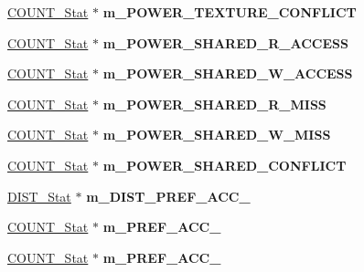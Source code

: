 \begin{DoxyCompactItemize}
\item 
\hypertarget{classall__stats__c_a65fd223770ab808c91e01dbbbe8b06cc}{
\hyperlink{classCOUNT__Stat}{COUNT\_\-Stat} $\ast$ {\bfseries m\_\-POWER\_\-TEXTURE\_\-CONFLICT}}
\label{classall__stats__c_a65fd223770ab808c91e01dbbbe8b06cc}

\item 
\hypertarget{classall__stats__c_a4eb18db354960c064d6380e5e2516b43}{
\hyperlink{classCOUNT__Stat}{COUNT\_\-Stat} $\ast$ {\bfseries m\_\-POWER\_\-SHARED\_\-R\_\-ACCESS}}
\label{classall__stats__c_a4eb18db354960c064d6380e5e2516b43}

\item 
\hypertarget{classall__stats__c_a0c170305f16a3135019716bb65c4cee8}{
\hyperlink{classCOUNT__Stat}{COUNT\_\-Stat} $\ast$ {\bfseries m\_\-POWER\_\-SHARED\_\-W\_\-ACCESS}}
\label{classall__stats__c_a0c170305f16a3135019716bb65c4cee8}

\item 
\hypertarget{classall__stats__c_afb5b1735ddccec196b7597d0a319b7fe}{
\hyperlink{classCOUNT__Stat}{COUNT\_\-Stat} $\ast$ {\bfseries m\_\-POWER\_\-SHARED\_\-R\_\-MISS}}
\label{classall__stats__c_afb5b1735ddccec196b7597d0a319b7fe}

\item 
\hypertarget{classall__stats__c_abc9cabb071a7dca7af8319cfbade9706}{
\hyperlink{classCOUNT__Stat}{COUNT\_\-Stat} $\ast$ {\bfseries m\_\-POWER\_\-SHARED\_\-W\_\-MISS}}
\label{classall__stats__c_abc9cabb071a7dca7af8319cfbade9706}

\item 
\hypertarget{classall__stats__c_af8d743915dcaa07818f82192b5510854}{
\hyperlink{classCOUNT__Stat}{COUNT\_\-Stat} $\ast$ {\bfseries m\_\-POWER\_\-SHARED\_\-CONFLICT}}
\label{classall__stats__c_af8d743915dcaa07818f82192b5510854}

\item 
\hypertarget{classall__stats__c_a38186f67e48556e7bb7f30748e7c2f74}{
\hyperlink{classDIST__Stat}{DIST\_\-Stat} $\ast$ {\bfseries m\_\-DIST\_\-PREF\_\-ACC\_}}
\label{classall__stats__c_a38186f67e48556e7bb7f30748e7c2f74}

\item 
\hypertarget{classall__stats__c_a735fed79a1ffb0198aa0b20bd757422b}{
\hyperlink{classCOUNT__Stat}{COUNT\_\-Stat} $\ast$ {\bfseries m\_\-PREF\_\-ACC\_}}
\label{classall__stats__c_a735fed79a1ffb0198aa0b20bd757422b}

\item 
\hypertarget{classall__stats__c_aa64b1fec49c1e63d6bb6df0832e557e4}{
\hyperlink{classCOUNT__Stat}{COUNT\_\-Stat} $\ast$ {\bfseries m\_\-PREF\_\-ACC\_}}
\label{classall__stats__c_aa64b1fec49c1e63d6bb6df0832e557e4}


\end{DoxyCompactItemize}
